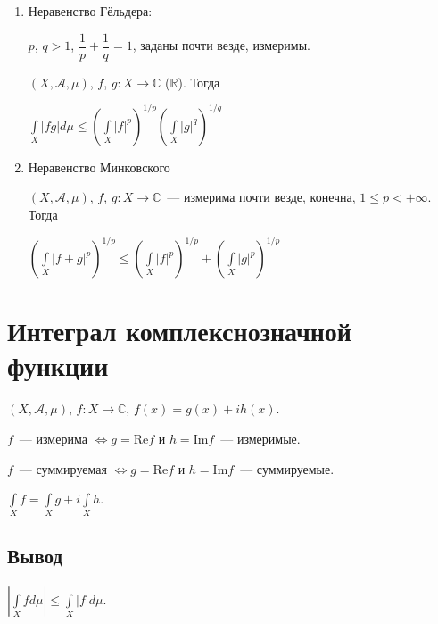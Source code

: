 \documentclass{article}
\begin{document}
        \begin{enumerate}
        
            \item Неравенство Гёльдера:
        
                $p$, $q > 1$, $\dfrac{1}{p} + \dfrac{1}{q} = 1$, заданы почти везде, измеримы.
            
                $(X, \mathcal{A}, \mu)$, $f$, $g : X \rightarrow \mathbb{C}$ ($\mathbb{R}$). Тогда
            
                $\int\limits_X |fg| d \mu \leqslant \left( \int\limits_X |f|^p \right)^{1/p} \left( \int\limits_X |g|^q \right)^{1/q}$
            
            \item Неравенство Минковского
        
                $(X, \mathcal{A}, \mu)$, $f$, $g : X \rightarrow \mathbb{C}$~--- измерима почти везде, конечна, $1 \leqslant p < +\infty$. Тогда
            
                $\left( \int\limits_X |f + g|^p \right)^{1/p} \leqslant \left( \int\limits_X |f|^p \right)^{1/p} + \left( \int\limits_X |g|^p \right)^{1/p}$
            
        \end{enumerate}
        
    \newpage

    \section{Интеграл комплекснозначной функции}
    
        $(X, \mathcal{A}, \mu)$, $f : X \rightarrow \mathbb{C}$, $f(x) = g(x) + i h(x)$.
        
        $f$~--- измерима $\Longleftrightarrow g = \mathrm{Re} f$ и $h = \mathrm{Im} f$~--- измеримые.
            
        $f$~--- суммируемая $\Longleftrightarrow g = \mathrm{Re} f$ и $h = \mathrm{Im} f$~--- суммируемые.
            
        $\int\limits_X f = \int\limits_X g + i \int\limits_X h$.
            
        \subsection{Вывод}
        
            $\left| \int\limits_X f d \mu \right| \leqslant \int\limits_X |f| d\mu$.
            
\end{document}
